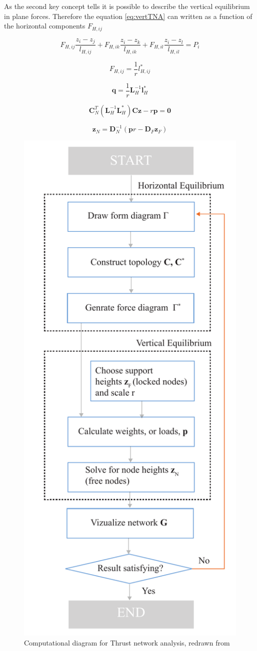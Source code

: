 As the second key concept tells it is possible to describe the vertical equilibrium in plane forces. Therefore the equation \ref{eq:vertTNA} can written as a function of the horizontal components $F_{H,ij}$  




\begin{equation}
    F_{H,ij}\frac{z_i-z_j}{l_{H,ij}} +F_{H,ik}\frac{z_i-z_k}{l_{H,ik}}+F_{H,il}\frac{z_i-z_l}{l_{H,il}} = P_i
\end{equation}


\begin{equation}
    F_{H,ij} =\frac{1}{r}{l^*_{H,ij}}
\end{equation}

\begin{equation}
    \textbf{q}=\frac{1}{r}\textbf{L}^{-1}_H\textbf{l}^*_{H}
\end{equation}

\begin{equation}
    \textbf{C}^T_N(\textbf{L}^{-1}_H\textbf{L}^*_H)\textbf{C}\textbf{z}- r\textbf{p} = \textbf{0}
\end{equation}

\begin{equation}
    \textbf{z}_N = \textbf{D}^{-1}_N(\textbf{p}r-\textbf{D}_F\textbf{z}_F)
\end{equation}


\begin{figure}[H]
\centering
\includegraphics[width=0.5\linewidth ]{figure/Theory/TNAScheme.pdf}
\caption{Computational diagram for Thrust network analysis, redrawn from \cite{ref:ShellOpt} }
\end{figure}

